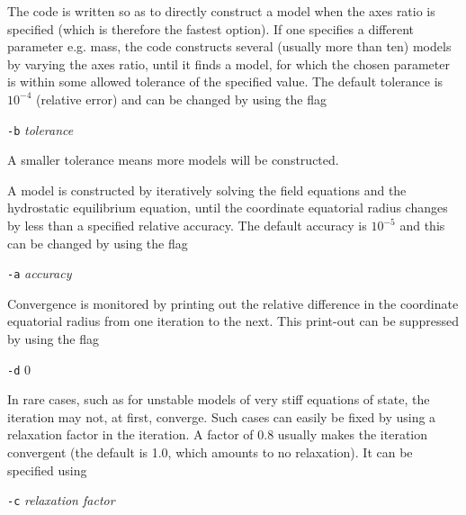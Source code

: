 \vspace{0.2cm}

\<The code is written so as to directly construct a model when 
the axes ratio is specified (which is therefore the fastest option). If one 
specifies a different parameter e.g. mass, the code constructs several (usually 
more than ten) models by varying the axes ratio, until it finds a model, for 
which the chosen parameter is within some allowed tolerance of the specified 
value. The default tolerance is $10^{-4}$ (relative error) and can be changed 
by using the flag

\vspace{0.3cm}

{\tt -b} {\it tolerance}

\vspace{0.3cm}

\<A smaller tolerance means more models will be constructed.

\vspace{0.2cm}

A model is constructed by iteratively solving the field equations and the 
hydrostatic equilibrium equation, until the coordinate equatorial radius changes
by less than a specified relative accuracy. The default accuracy is $10^{-5}$
and this can be changed by using the flag

\vspace{0.3cm}

{\tt -a} {\it accuracy}
 
\vspace{0.3cm}

\<Convergence is monitored by printing out the relative difference in the 
coordinate equatorial radius from one iteration to the next. This print-out can 
be suppressed by using the flag

\vspace{0.3cm}

{\tt -d} 0

\vspace{0.3cm}

\<In rare cases, such as for unstable models of very stiff equations of state,
the iteration may not, at first, converge. Such cases can easily be fixed by 
using a relaxation factor in the iteration. A factor of 0.8 usually makes the
iteration convergent (the default is 1.0, which amounts to no relaxation). 
It can be specified using

\vspace{0.3cm}

{\tt -c} {\it relaxation factor}
 
